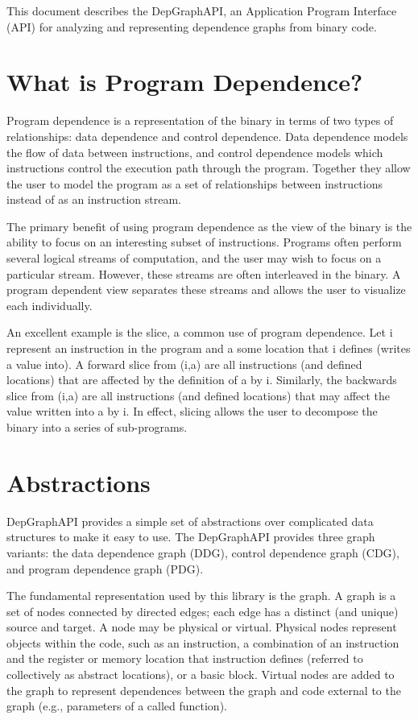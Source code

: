 \documentclass[12pt]{article}
\begin{document}
This document describes the DepGraphAPI, an Application Program
Interface (API) for analyzing and representing dependence graphs from
binary code.

\section{What is Program Dependence?}

Program dependence is a representation of the binary in terms of two
types of relationships: data dependence and control dependence. Data
dependence models the flow of data between instructions, and control
dependence models which instructions control the execution path
through the program. Together they allow the user to model the program
as a set of relationships between instructions instead of as an
instruction stream.  

The primary benefit of using program dependence as the view of the
binary is the ability to focus on an interesting subset of
instructions. Programs often perform several logical streams of
computation, and the user may wish to focus on a particular
stream. However, these streams are often interleaved in the binary. A
program dependent view separates these streams and allows the user to
visualize each individually.

An excellent example is the slice, a common use of program
dependence. Let i represent an instruction in the program and a some
location that i defines (writes a value into). A forward slice from
(i,a) are all instructions (and defined locations) that are affected
by the definition of a by i. Similarly, the backwards slice from (i,a)
are all instructions (and defined locations) that may affect the value
written into a by i. In effect, slicing allows the user to decompose
the binary into a series of sub-programs.  

\section{Abstractions}

DepGraphAPI provides a simple set of abstractions over complicated
data structures to make it easy to use. The DepGraphAPI provides three
graph variants: the data dependence graph (DDG), control dependence
graph (CDG), and program dependence graph (PDG).

The fundamental representation used by this library is the graph. A
graph is a set of nodes connected by directed edges; each edge has a
distinct (and unique) source and target. A node may be physical or
virtual. Physical nodes represent objects within the code, such as an
instruction, a combination of an instruction and the register or
memory location that instruction defines (referred to collectively as
abstract locations), or a basic block. Virtual nodes are added to the
graph to represent dependences between the graph and code external to
the graph (e.g., parameters of a called function).
\end{document}
